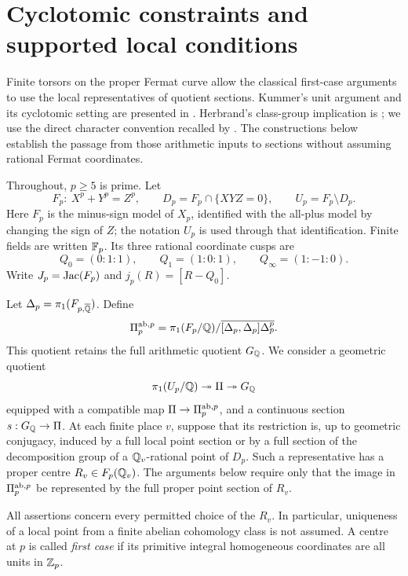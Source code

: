 \section{Cyclotomic constraints and supported local conditions}
\label{sec:irreg-setup}

Finite torsors on the proper Fermat curve allow the classical first-case
arguments to use the local representatives of quotient sections.
Kummer's unit argument and its cyclotomic setting are presented in
\citet[Theorem~1.1 and Proposition~1.5, pp.~1--6]{Washington1982}.
Herbrand's class-group implication is
\citet[\S4, pp.~423--431]{Herbrand1932}; we use the direct character
convention recalled by
\citet[Theorem~1.1 and the following paragraph, p.~151]{Ribet1976}.
The constructions below establish the passage from those arithmetic
inputs to sections without assuming rational Fermat coordinates.

Throughout, \(p\geq5\) is prime. Let
\[
 F_p:\ X^p+Y^p=Z^p,\qquad
 D_p=F_p\cap\{XYZ=0\},\qquad U_p=F_p\setminus D_p.
\]
Here \(F_p\) is the minus-sign model of \(X_p\), identified with
the all-plus model by changing the sign of \(Z\); the notation
\(U_p\) is used through that identification. Finite fields are
written \(\mathbb F_p\). Its three rational coordinate cusps are
\[
 Q_0=(0:1:1),\qquad Q_1=(1:0:1),\qquad Q_\infty=(1:-1:0).
\]
Write \(J_p=\operatorname{Jac}(F_p)\) and \(j_p(R)=[R-Q_0]\).

Let \(\Delta_p=\pi_1(F_{p,\overline{\mathbb Q}})\). Define
\[
 \Pi_p^{\mathrm{ab},p}
 =
 \pi_1(F_p/\mathbb Q)/
 \overline{[\Delta_p,\Delta_p]\Delta_p^p}.
\]
This quotient retains the full arithmetic quotient \(G_\mathbb Q\).
We consider a geometric quotient
\[
 \pi_1(U_p/\mathbb Q)\twoheadrightarrow\Pi\twoheadrightarrow G_\mathbb Q
\]
equipped with a compatible map \(\Pi\to\Pi_p^{\mathrm{ab},p}\), and a continuous
section \(s:G_\mathbb Q\to\Pi\). At each finite place \(v\), suppose that its
restriction is, up to geometric conjugacy, induced by a full local
point section or by a full section of the decomposition group of a
\(\mathbb Q_v\)-rational point of \(D_p\). Such a representative has a proper
centre \(R_v\in F_p(\mathbb Q_v)\). The arguments below require only that the
image in \(\Pi_p^{\mathrm{ab},p}\) be represented by the full proper point
section of \(R_v\).

All assertions concern every permitted choice of the \(R_v\). In
particular, uniqueness of a local point from a finite abelian
cohomology class is not assumed. A centre at \(p\) is called
\emph{first case} if its primitive integral homogeneous coordinates
are all units in \(\mathbb Z_p\).

